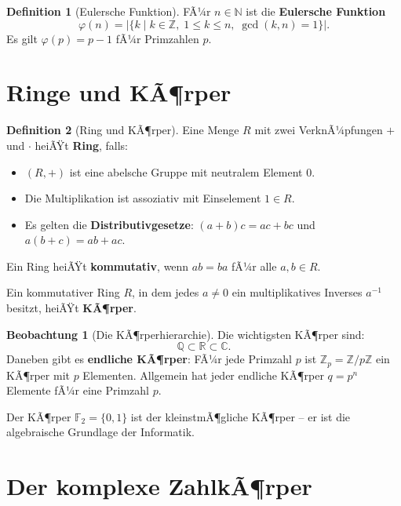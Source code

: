 ﻿\documentclass[a4paper,12pt]{report}
\theoremstyle{definition}
\newtheorem{definition}{Definition}
\newtheorem{beobachtung}{Beobachtung}
\begin{document}
\begin{definition}[Eulersche Funktion]
    FÃ¼r $n \in \mathbb{N}$ ist die \textbf{Eulersche Funktion}
    \[
        \varphi(n) = |\{k \mid k \in \mathbb{Z},\; 1 \le k \le n,\; \gcd(k, n) = 1\}|.
    \]
    Es gilt $\varphi(p) = p - 1$ fÃ¼r Primzahlen $p$.
\end{definition}

\section{Ringe und KÃ¶rper}

\begin{definition}[Ring und KÃ¶rper]
    Eine Menge $R$ mit zwei VerknÃ¼pfungen $+$ und $\cdot$ heiÃŸt \textbf{Ring},
    falls:
    \begin{itemize}
        \item[-] $(R, +)$ ist eine abelsche Gruppe mit neutralem Element $0$.
        \item[-] Die Multiplikation ist assoziativ mit Einselement $1 \in R$.
        \item[-] Es gelten die \textbf{Distributivgesetze}:
              $(a + b)c = ac + bc$ und $a(b + c) = ab + ac$.
    \end{itemize}
    Ein Ring heiÃŸt \textbf{kommutativ}, wenn $ab = ba$ fÃ¼r alle $a, b \in R$.

    Ein kommutativer Ring $R$, in dem jedes $a \neq 0$ ein multiplikatives
    Inverses $a^{-1}$ besitzt, heiÃŸt \textbf{KÃ¶rper}.
\end{definition}

\begin{beobachtung}[Die KÃ¶rperhierarchie]
    Die wichtigsten KÃ¶rper sind:
    \[
        \mathbb{Q} \subset \mathbb{R} \subset \mathbb{C}.
    \]
    Daneben gibt es \textbf{endliche KÃ¶rper}: FÃ¼r jede Primzahl $p$ ist
    $\mathbb{Z}_p = \mathbb{Z}/p\mathbb{Z}$ ein KÃ¶rper mit $p$ Elementen. Allgemein
    hat jeder endliche KÃ¶rper $q = p^n$ Elemente fÃ¼r eine Primzahl $p$.

    Der KÃ¶rper $\mathbb{F}_2 = \{0, 1\}$ ist der kleinstmÃ¶gliche KÃ¶rper -- er
    ist die algebraische Grundlage der Informatik.
\end{beobachtung}

\section{Der komplexe ZahlkÃ¶rper}
\end{document}
